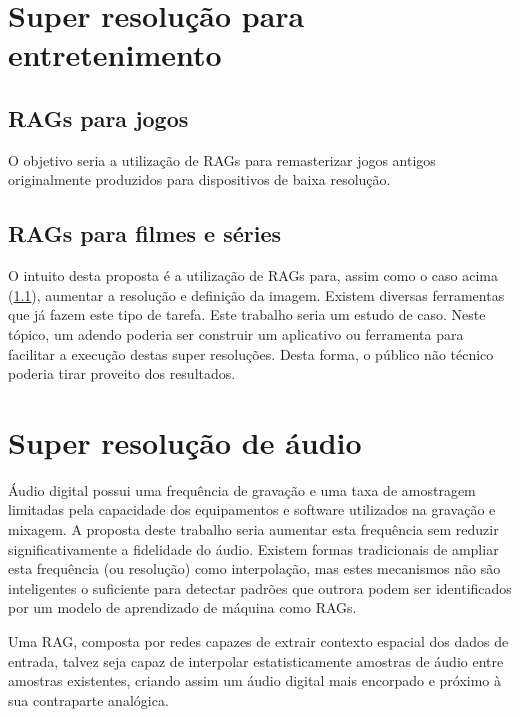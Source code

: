 \section{Super resolução para entretenimento}
\label{sec:trabalhos-futuros:entretenimento}

\subsection{RAGs para jogos}
\label{sec:trabalhos-futuros:entretenimento:jogos}

O objetivo seria a utilização de RAGs para remasterizar jogos antigos originalmente produzidos para dispositivos de baixa resolução. 

\subsection{RAGs para filmes e séries}
\label{sec:trabalhos-futuros:entretenimento:filmes-series}

O intuito desta proposta é a utilização de RAGs para, assim como o caso acima (\ref{sec:trabalhos-futuros:entretenimento:jogos}), aumentar a resolução e definição da imagem. Existem diversas ferramentas que já fazem este tipo de tarefa. Este trabalho seria um estudo de caso. Neste tópico, um adendo poderia ser construir um aplicativo ou ferramenta para facilitar a execução destas super resoluções. Desta forma, o público não técnico poderia tirar proveito dos resultados. 

\section{Super resolução de áudio}
\label{sec:trabalhos-futuros:audio}

Áudio digital possui uma frequência de gravação e uma taxa de amostragem limitadas pela capacidade dos equipamentos e software utilizados na gravação e mixagem. A proposta deste trabalho seria aumentar esta frequência sem reduzir significativamente a fidelidade do áudio. Existem formas tradicionais de ampliar esta frequência (ou resolução) como interpolação, mas estes mecanismos não são inteligentes o suficiente para detectar padrões que outrora podem ser identificados por um modelo de aprendizado de máquina como RAGs. 

Uma RAG, composta por redes capazes de extrair contexto espacial dos dados de entrada, talvez seja capaz de interpolar estatisticamente amostras de áudio entre amostras existentes, criando assim um áudio digital mais encorpado e próximo à sua contraparte analógica. 

